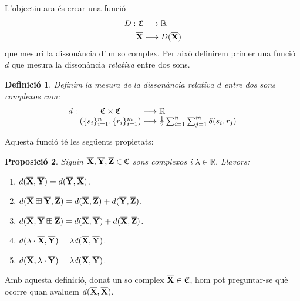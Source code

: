 \documentclass{article}
\theoremstyle{math}
\newtheorem{definition}{Definició}[section]
\newtheorem{prop}[definition]{Proposició}
\newcommand{\0}{\ensuremath{\vb{0}}}
\newcommand{\X}{\ensuremath{\vb{X}}}
\newcommand{\Y}{\ensuremath{\vb{Y}}}
\newcommand{\Z}{\ensuremath{\vb{Z}}}
\newcommand{\RR}{\ensuremath{\mathbb{R}}} %
\begin{document}
L'objectiu ara és crear una funció 
\begin{align*}
    D:\mathfrak{C}&\longrightarrow\RR\\
    \overline{\X}&\longmapsto D(\overline{\X})
\end{align*}
que mesuri la dissonància d'un so complex. Per això definirem primer una funció $d$ que mesura la dissonància \textit{relativa} entre dos sons.
\begin{definition}
    Definim la \textit{mesura de la dissonància relativa $d$} entre dos sons complexos com:
    \begin{equation*}
        \begin{array}{r@{\hspace{0.5\tabcolsep}}c@{\hspace{0.5\tabcolsep}}c@{\hspace{0.5\tabcolsep}}l}
            d:&\mathfrak{C}\times\mathfrak{C}&\longrightarrow&\RR\\
        &(\{s_i\}_{i=1}^n,\{r_i\}_{i=1}^m)&\longmapsto&\frac{1}{2}\sum_{i=1}^n\sum_{j=1}^m\delta(s_i,r_j)
        \end{array}
    \end{equation*}
\end{definition}
Aquesta funció té les següents propietats:
\begin{prop}
    Siguin $\overline{\X},\overline{\Y},\overline{\Z}\in\mathfrak{C}$ sons complexos i $\lambda\in\RR$. Llavors:
    \begin{enumerate}[label=$d$\arabic*),ref=$d$\arabic*]
        \item\label{d1} $d(\overline{\X},\overline{\Y})=d(\overline{\Y},\overline{\X})$.
        \item\label{d2} $d(\overline{\X}\boxplus\overline{\Y},\overline{\Z})=d(\overline{\X},\overline{\Z})+d(\overline{\Y},\overline{\Z})$.
        \item\label{d3} $d(\overline{\X},\overline{\Y}\boxplus\overline{\Z})=d(\overline{\X},\overline{\Y})+d(\overline{\X},\overline{\Z})$.
        \item\label{d4} $d(\lambda\cdot\overline{\X},\overline{\Y})=\lambda d(\overline{\X},\overline{\Y})$.
        \item\label{d5} $d(\overline{\X},\lambda\cdot\overline{\Y})=\lambda d(\overline{\X},\overline{\Y})$.
    \end{enumerate}
\end{prop}
Amb aquesta definició, donat un so complex $\overline{\X}\in\mathfrak{C}$, hom pot preguntar-se què ocorre quan avaluem $d(\overline{\X},\overline{\X})$.
\end{document}
